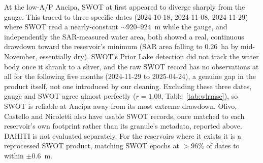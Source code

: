 At the low-A/P Ancipa, SWOT at first appeared to diverge sharply from the gauge. This traced
to three specific dates (2024-10-18, 2024-11-08, 2024-11-29) where SWOT read a nearly-constant
${\sim}920$--$924$~m while the gauge, and independently the SAR-measured water area, both
showed a real, continuous drawdown toward the reservoir's minimum (SAR area falling to
$0.26$~ha by mid-November, essentially dry). SWOT's Prior Lake detection did not track the
water body once it shrank to a sliver, and the raw
SWOT record has no observations at all for the following five months (2024-11-29 to
2025-04-24), a genuine gap in the product itself, not one introduced by our cleaning.
Excluding these three dates, gauge and SWOT agree almost perfectly ($r=1.00$,
Table~\ref{tab:wlrmse}), so SWOT is reliable at Ancipa away from its most extreme drawdown.
Olivo,
Castello and Nicoletti also have usable SWOT records, once matched to each reservoir's own
footprint rather than its granule's metadata, reported above. DAHITI is not evaluated
separately. For the reservoirs where it exists it is a reprocessed
SWOT product, matching SWOT epochs at $>96\%$ of dates to within $\pm0.6$~m.

